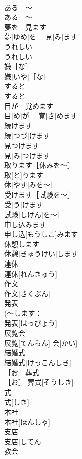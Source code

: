 \documentclass[8pt]{extreport}
\begin{document}
\begin{CJK}{UTF8}{min}
\\	ある　〜	
\\	ある　〜	
\\	夢を　見ます	
\\	夢[ゆめ]を　 見[み]ます	
\\	うれしい	
\\	うれしい	
\\	嫌［な］	
\\	嫌[いや]［な］	
\\	すると	
\\	すると	
\\	目が　覚めます	
\\	目[め]が　 覚[さ]めます	
\\	続けます	
\\	続[つづ]けます	
\\	見つけます	
\\	見[み]つけます	
\\	取ります［休みを〜］	
\\	取[と]ります
\\	休[やす]みを〜］	
\\	受けます［試験を〜］	
\\	受[う]けます
\\	試験[しけん]を〜］	
\\	申し込みます	
\\	申し込[もうしこ]みます	
\\	休憩します	
\\	休憩[きゅうけい]します	
\\	連休	
\\	連休[れんきゅう]	
\\	作文	
\\	作文[さくぶん]	
\\	発表	
\\	(〜します：
\\	発表[はっぴょう]	
\\	展覧会	
\\	展覧[てんらん] 会[かい]	
\\	結婚式	
\\	結婚式[けっこんしき]	
\\	［お］葬式	
\\	［お］ 葬式[そうしき]	
\\	式	
\\	式[しき]	
\\	本社	
\\	本社[ほんしゃ]	
\\	支店	
\\	支店[してん]	
\\	教会	

\end{CJK}
\end{document}
